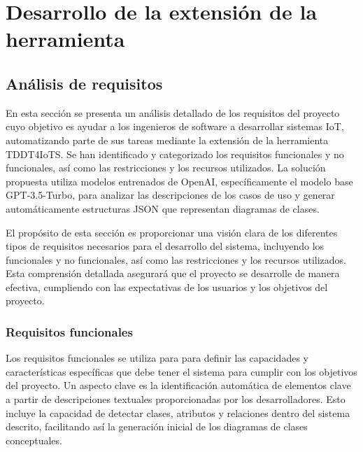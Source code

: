 \chapter{Desarrollo de la extensión de la herramienta}\label{chapter:desarrollo}

\section{Análisis de requisitos}

En esta sección se presenta un análisis detallado de los requisitos del proyecto cuyo objetivo es ayudar a los ingenieros de software a desarrollar sistemas IoT, automatizando parte de sus tareas mediante la extensión de la herramienta TDDT4IoTS. Se han identificado y categorizado los requisitos funcionales y no funcionales, así como las restricciones y los recursos utilizados. La solución propuesta utiliza modelos entrenados de OpenAI, específicamente el modelo base GPT-3.5-Turbo, para analizar las descripciones de los casos de uso y generar automáticamente estructuras JSON que representan diagramas de clases.


El propósito de esta sección es proporcionar una visión clara de los diferentes tipos de requisitos necesarios para el desarrollo del sistema, incluyendo los funcionales y no funcionales, así como las restricciones y los recursos utilizados. Esta comprensión detallada asegurará que el proyecto se desarrolle de manera efectiva, cumpliendo con las expectativas de los usuarios y los objetivos del proyecto.

\subsection{Requisitos funcionales}

Los requisitos funcionales se utiliza para para definir las capacidades y características específicas que debe tener el sistema para cumplir con los objetivos del proyecto. Un aspecto clave es la identificación automática de elementos clave a partir de descripciones textuales proporcionadas por los desarrolladores. Esto incluye la capacidad de detectar clases, atributos y relaciones dentro del sistema descrito, facilitando así la generación inicial de los diagramas de clases conceptuales.

